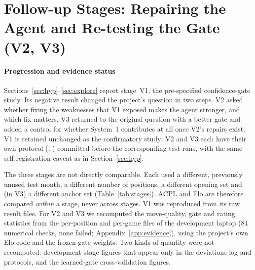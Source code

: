 \section{Follow-up Stages: Repairing the Agent and Re-testing the Gate (V2, V3)}
\label{sec:followup}
\paragraph*{Progression and evidence status}
Sections~\ref{sec:hyp}--\ref{sec:explore} report stage~V1, the pre-specified confidence-gate study. Its negative result changed the project's question in two steps. V2 asked whether fixing the weaknesses that V1 exposed makes the agent stronger, and which fix matters. V3 returned to the original question with a better gate and added a control for whether System~1 contributes at all once V2's repairs exist. V1 is retained unchanged as the confirmatory study; V2 and V3 each have their own protocol (, ) committed before the corresponding test runs, with the same self-registration caveat as in Section~\ref{sec:hyp}.

The three stages are not directly comparable. Each used a different, previously unused test month, a different number of positions, a different opening set and (in V3) a different anchor set (Table~\ref{tab:stages}). ACPL and Elo are therefore compared \emph{within} a stage, never across stages. V1 was reproduced from its raw result files. For V2 and V3 we recomputed the move-quality, gate and rating statistics from the per-position and per-game files of the development laptop (84 numerical checks, none failed; Appendix~\ref{app:evidence}), using the project's own Elo code and the frozen gate weights. Two kinds of quantity were not recomputed: development-stage figures that appear only in the deviations log and protocols, and the learned-gate cross-validation figures.

